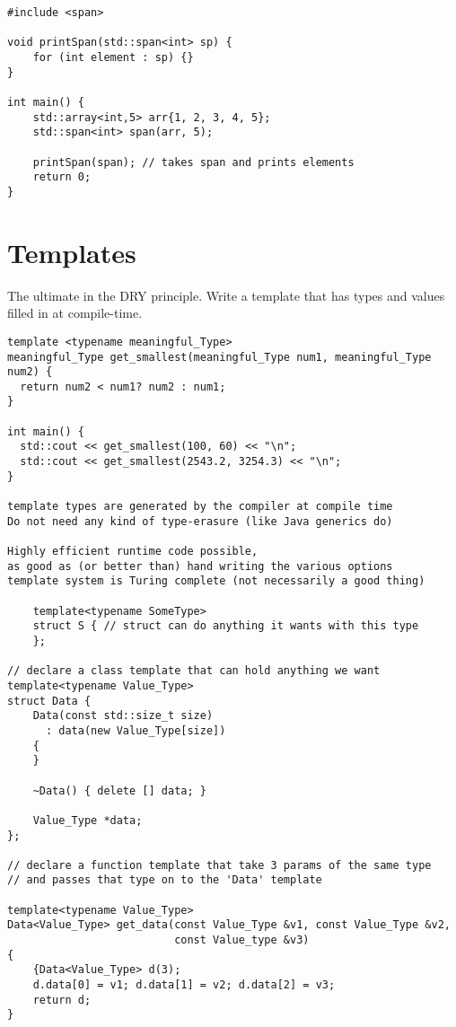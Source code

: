 \documentclass[openany]{report}
\begin{document}
\begin{verbatim}
#include <span>

void printSpan(std::span<int> sp) {
    for (int element : sp) {}
}

int main() {
    std::array<int,5> arr{1, 2, 3, 4, 5};
    std::span<int> span(arr, 5);

    printSpan(span); // takes span and prints elements
    return 0;
}
\end{verbatim}

\section{Templates}

The ultimate in the DRY principle. Write a template that has types and values filled in at compile-time.

\begin{verbatim}
template <typename meaningful_Type>
meaningful_Type get_smallest(meaningful_Type num1, meaningful_Type num2) {
  return num2 < num1? num2 : num1;
}

int main() {
  std::cout << get_smallest(100, 60) << "\n";
  std::cout << get_smallest(2543.2, 3254.3) << "\n";
}

template types are generated by the compiler at compile time
Do not need any kind of type-erasure (like Java generics do)

Highly efficient runtime code possible, 
as good as (or better than) hand writing the various options
template system is Turing complete (not necessarily a good thing)

    template<typename SomeType>
    struct S { // struct can do anything it wants with this type
    };

// declare a class template that can hold anything we want
template<typename Value_Type>
struct Data {
    Data(const std::size_t size)
      : data(new Value_Type[size])
    {
    }

    ~Data() { delete [] data; }

    Value_Type *data;
};

// declare a function template that take 3 params of the same type
// and passes that type on to the 'Data' template

template<typename Value_Type>
Data<Value_Type> get_data(const Value_Type &v1, const Value_Type &v2,
                          const Value_type &v3)
{
    {Data<Value_Type> d(3);
    d.data[0] = v1; d.data[1] = v2; d.data[2] = v3;
    return d;
}
\end{verbatim}
\end{document}
